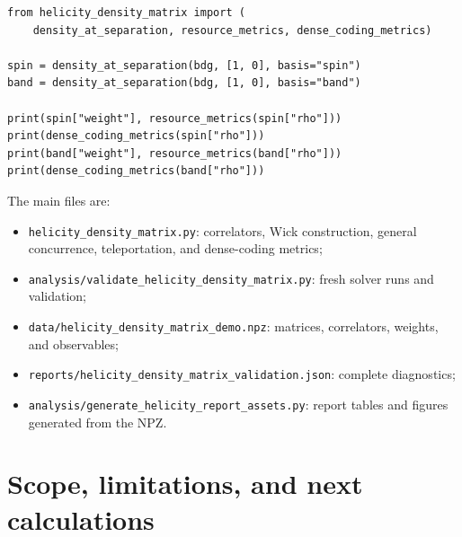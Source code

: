 \documentclass[11pt]{article}
\begin{document}
\begin{verbatim}
from helicity_density_matrix import (
    density_at_separation, resource_metrics, dense_coding_metrics)

spin = density_at_separation(bdg, [1, 0], basis="spin")
band = density_at_separation(bdg, [1, 0], basis="band")

print(spin["weight"], resource_metrics(spin["rho"]))
print(dense_coding_metrics(spin["rho"]))
print(band["weight"], resource_metrics(band["rho"]))
print(dense_coding_metrics(band["rho"]))
\end{verbatim}

The main files are:
\begin{itemize}
\item \verb|helicity_density_matrix.py|: correlators, Wick construction, general concurrence, teleportation, and dense-coding metrics;
\item \verb|analysis/validate_helicity_density_matrix.py|: fresh solver runs and validation;
\item \verb|data/helicity_density_matrix_demo.npz|: matrices, correlators, weights, and observables;
\item \verb|reports/helicity_density_matrix_validation.json|: complete diagnostics;
\item \verb|analysis/generate_helicity_report_assets.py|: report tables and figures generated from the NPZ.
\end{itemize}

\section{Scope, limitations, and next calculations}
\label{sec:limitations}
\end{document}

